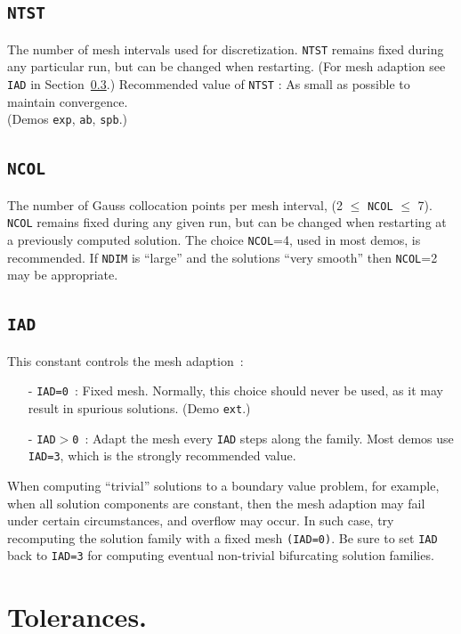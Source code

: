 \documentclass[12pt]{report}
\begin{document}
\subsection{\texttt{NTST}}  \label{sec:NTST}
 The number of mesh intervals used for discretization.
 {\tt NTST} remains fixed during any particular run, but can be changed
 when restarting. 
 (For mesh adaption see {\tt IAD} in Section~\ref{sec:IAD}.)
 Recommended value of {\tt NTST} : As small as possible to maintain convergence. \\ 
 (Demos {\tt exp}, {\tt ab}, {\tt spb}.)


\subsection{\texttt{NCOL}}  \label{sec:NCOL}
 The number of Gauss collocation points per mesh interval,
 (2 $\le$ {\tt NCOL} $\le$ 7).
 {\tt NCOL} remains fixed during any given run, but can be changed
 when restarting at a previously computed solution.
 The choice {\tt NCOL}=4, used in most demos, is recommended.
 If {\tt NDIM} is ``large'' and the solutions ``very smooth'' then
 {\tt NCOL}=2 may be appropriate.

\subsection{\texttt{IAD}} \label{sec:IAD}
This constant controls the mesh adaption~: 
\begin{itemize}
\item[-] {\tt IAD=0}~:
  Fixed mesh. Normally, this choice should never be used, as it may result
  in spurious solutions. (Demo {\tt ext}.)
\item[-] {\tt IAD$>$0}~:  
  Adapt the mesh every {\tt IAD} steps along the family.
  Most demos use {\tt IAD=3}, which is the strongly recommended value.
\end{itemize}

When computing  ``trivial'' solutions to a boundary value problem,
for example, when all solution components are constant, then the
mesh adaption may fail under certain circumstances, and overflow may
occur. In such case, try recomputing the solution family with a fixed
mesh {\tt (IAD=0)}. Be sure to set  {\tt IAD} back to {\tt IAD=3} 
for computing eventual non-trivial bifurcating solution families.
\section{ Tolerances.} \label{sec:Tolerances}
\end{document}
